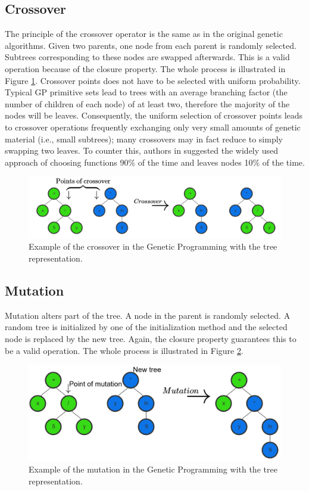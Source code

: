  \subsection{Crossover}
 The principle of the crossover operator is the same as in the original genetic algorithms.  Given two parents, one node from each parent is randomly selected. Subtrees corresponding to these nodes are swapped afterwards. This is a valid operation because of the closure property. The whole process is illustrated in Figure \ref{fig:gpcrossover}. Crossover points does not have to be selected with uniform probability. Typical GP primitive sets lead to trees with an average branching factor (the number of children of each node) of at least two, therefore  the majority of the nodes will be leaves. Consequently, the uniform selection of crossover points leads to crossover operations frequently exchanging only very small amounts of genetic material (i.e., small subtrees); many crossovers may in fact reduce to simply swapping two leaves. To counter this, authors in \cite{KozaGP} suggested the widely used approach of choosing functions 90\% of the time and leaves nodes 10\% of the time.
 
 \begin{figure}
 	\includegraphics[width=14cm]{Images/gpcrossover.png}
 	\centering
 	\caption{Example of the crossover in the Genetic Programming with the tree representation.}
 	\label{fig:gpcrossover}	
 \end{figure}
 
 \subsection{Mutation}
 Mutation alters part of the tree. A node in the parent is randomly selected. A random tree is initialized by one of the initialization method and the selected node is replaced by the new tree. Again, the closure property guarantees this to be a valid operation. The whole process is illustrated in Figure \ref{fig:gpmutation}. 
 
 \begin{figure}
 	\includegraphics[width=12cm]{Images/gpmutation.png}
 	\centering
 	\caption{Example of the mutation in the Genetic Programming with the tree representation.}
 	\label{fig:gpmutation}	
 \end{figure}
 
